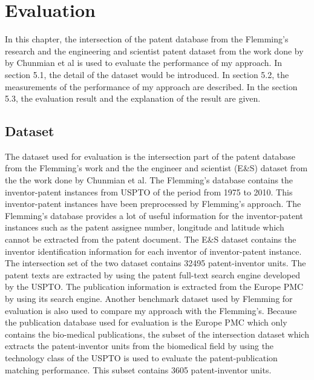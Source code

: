 \chapter{Evaluation}
\label{cha:eval}
In this chapter, the intersection of the patent database from the Flemming's research and the engineering and scientist patent dataset from the work done by by Chunmian et al is used to evaluate the performance of my approach.  In section 5.1, the detail of the dataset would be introduced. In section 5.2, the measurements of the performance of my approach are described. In the section 5.3, the evaluation result and the explanation of the result are given. 

\section{Dataset}
The dataset used for evaluation is the intersection part of the patent database from the Flemming's work and the the engineer and scientist (E\&S) dataset from the the work done by Chunmian et al. The Flemming's database contains the inventor-patent instances from USPTO of the period from 1975 to 2010. This inventor-patent instances have been preprocessed by Flemming's approach. The Flemming's database provides a lot of useful information for the inventor-patent instances such as the patent assignee number, longitude and latitude which cannot be extracted from the patent document. The E\&S dataset contains the inventor identification information for each inventor of inventor-patent instance.  The intersection set of the two dataset contains 32495 patent-inventor units. The patent texts are extracted by using the patent full-text search engine developed by the USPTO.  The publication information is extracted from the Europe PMC by using its search engine. Another benchmark dataset used by Flemming for evaluation is also used to compare my approach with the Flemming's. Because the publication database used for evaluation is the Europe PMC which only contains the bio-medical publications, the subset of the intersection dataset which extracts the patent-inventor units from the biomedical field by using the technology class of the USPTO is used to evaluate the patent-publication matching performance. This subset contains 3605 patent-inventor units. 

